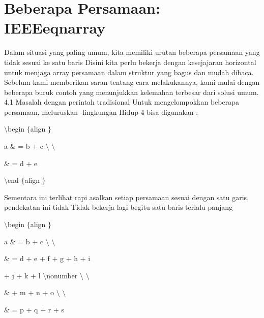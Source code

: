 \section{Beberapa Persamaan: IEEEeqnarray} 
\noindent 
 \hspace*{0.5in} Dalam situasi yang paling umum, kita memiliki urutan beberapa persamaan yang tidak sesuai ke satu baris Disini kita perlu bekerja dengan kesejajaran horizontal untuk menjaga array persamaan dalam struktur yang bagus dan mudah dibaca. Sebelum kami memberikan saran tentang cara melakukannya, kami mulai dengan beberapa buruk contoh yang menunjukkan kelemahan terbesar dari solusi umum. 4.1 Masalah dengan perintah tradisional Untuk mengelompokkan beberapa persamaan, meluruskan -lingkungan Hidup 4 bisa digunakan : \par
\vspace{12pt}
\noindent 
 $  \setminus  $begin $  \{  $align $  \}  $ \par
\vspace{12pt}
\noindent 
a  $  \&  $ = b + c  $  \setminus  $ $  \setminus  $ \par
\vspace{12pt}
\noindent 
 $  \&  $ = d + e \par
\vspace{12pt}
\noindent 
 $  \setminus  $end $  \{  $align $  \}  $ \par
\vspace{12pt}
\noindent 
Sementara ini terlihat rapi asalkan setiap persamaan sesuai dengan satu garis, pendekatan ini tidak Tidak bekerja lagi begitu satu baris terlalu panjang \par
\noindent 
 $  \setminus  $begin $  \{  $align $  \}  $ \par
\vspace{12pt}
\noindent 
a  $  \&  $ = b + c  $  \setminus  $ $  \setminus  $ \par
\vspace{12pt}
\noindent 
 $  \&  $ = d + e + f + g + h + i \par
\noindent 
  \par
\noindent 
+ j + k + l  $  \setminus  $nonumber $  \setminus  $ $  \setminus  $ \par
\vspace{12pt}
\noindent 
 $  \&  $ + m + n + o  $  \setminus  $ $  \setminus  $ \par
\vspace{12pt}
\noindent 
 $  \&  $ = p + q + r + s \par
\vspace{12pt}
